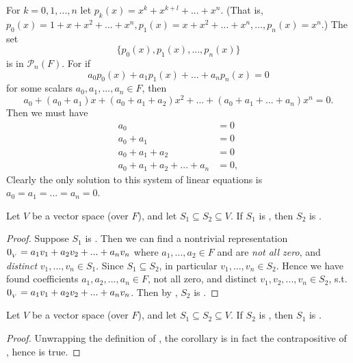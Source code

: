 \begin{example} \label{example 1.5.4}
For \(k = 0, 1, ..., n\) let \(p_k(x) = x^k + x^{k+l} + ... + x^n\).
(That is, \(p_0(x) = 1 + x + x^2 + ... + x^n, p_1(x) = x + x^2 + ... + x^n, ..., p_n(x) = x^n\).)
The set
\[
    \{ p_0(x), p_1(x), ..., p_n(x) \}
\]
is \LID{} in \(\mathcal{P}_n(F)\).
For if
\[
    a_0 p_0(x) + a_1 p_1(x) + ... + a_n p_n(x) = 0
\]
for some scalars \(a_0, a_1, ..., a_n \in F\), then
\[
    a_0 + (a_0 + a_1)x + (a_0 + a_1 + a_2)x^2 + ... + (a_0 + a_1 + ... + a_n)x^n = 0.
\]
Then we must have
\begin{align*}
                            a_0 & = 0 \\
                      a_0 + a_1 & = 0 \\
                a_0 + a_1 + a_2 & = 0 \\
    a_0 + a_1 + a_2 + ... + a_n & = 0,
\end{align*}
Clearly the only solution to this system of linear equations is \(a_0 = a_1 = ... = a_n = 0\).
\end{example}

\begin{theorem} \label{thm 1.6}
Let \(V\) be a vector space (over \(F\)), and let \(S_1 \subseteq S_2 \subseteq V\).
If \(S_1\) is \LDP{}, then \(S_2\) is \LDP{}.
\end{theorem}

\begin{proof}
Suppose \(S_1\) is \LDP{}.
Then we can find a nontrivial representation \(0_{_V} = a_1 v_1 + a_2 v_2 + ... + a_n v_n\) where \(a_1, ..., a_2 \in F\) and are \emph{not all zero}, and \emph{distinct} \(v_1, ..., v_n \in S_1\).
Since \(S_1 \subseteq S_2\), in particular \(v_1, ..., v_n \in S_2\).
Hence we have found coefficients \(a_1, a_2, ..., a_n \in F\), not all zero, and distinct \(v_1, v_2, ..., v_n \in S_2\), s.t. \(0_{_V} = a_1 v_1 + a_2 v_2 + ... + a_n v_n\).
Then by , \(S_2\) is \LDP{}.
\end{proof}

\begin{corollary} \label{corollary 1.6.1}
Let \(V\) be a vector space (over \(F\)), and let \(S_1 \subseteq S_2 \subseteq V\).
If \(S_2\) is \LID{}, then \(S_1\) is \LID{}.
\end{corollary}

\begin{proof}
Unwrapping the definition of \LID{}, the corollary is in fact the contrapositive of , hence is true.
\end{proof}

